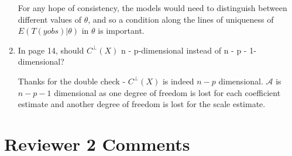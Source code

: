 \documentclass{article}
\newcommand{\response}[1]{{\color{blue}#1}}
\begin{document}
\begin{enumerate}
{For any hope of consistency, the models would need to distinguish between different values of $\theta$, and so a condition along the lines of uniqueness of $E(T(yobs)|\theta)$ in $\theta$ is important.  
}

\item In page 14, should $C^\perp(X)$ n - p-dimensional instead of n - p - 1-dimensional?

\response{Thanks for the double check - $C^\perp(X)$ is indeed $n-p$ dimensional.  $\mathcal{A}$ is $n-p-1$ dimensional as one degree of freedom is lost for each coefficient estimate and another degree of freedom is lost for the scale estimate.}

\end{enumerate}

\section{Reviewer 2 Comments}
\end{document}
